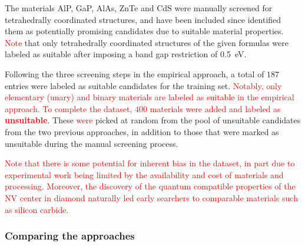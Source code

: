 \documentclass[superscriptaddress,unsortedaddress,
 amsmath,amssymb,
 aps,
]{revtex4-2}
\newcommand{\mrk}[1]{\textcolor{red}{#1}}
\begin{document}
The materials AlP, GaP, AlAs, ZnTe and CdS were manually screened for tetrahedrally coordinated structures, and have been included since \citeauthor{Weber2010} \cite{Weber2010} identified them as potentially promising candidates due to suitable material properties. 
\mrk{Note} that only tetrahedrally coordinated structures of the given formulas were labeled as suitable after imposing a band gap restriction of \SI{0.5}{\electronvolt}. 

Following the three screening steps in the empirical approach, a total of $187$ entries were labeled as suitable candidates for the training set. \mrk{Notably, only elementary (unary) and binary materials are labeled as suitable in the empirical approach.} \mrk{To complete the dataset, $400$ materials were added and labeled as \textbf{unsuitable}}. These \mrk{were} picked at random from the pool of unsuitable candidates from the two previous approaches, in addition to those that were marked as unsuitable during the manual screening process. 

\mrk{Note that there is some potential for inherent bias in the dataset, in part due to experimental work being limited by the availability and cost of materials and processing. Moreover, the discovery of the quantum compatible properties of the NV center in diamond naturally led early searchers to comparable materials such as silicon carbide.  %
} 

\subsubsection*{Comparing the approaches}
\end{document}
